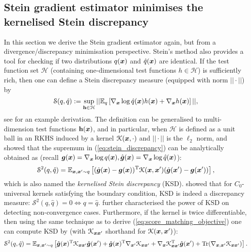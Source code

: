 \subsection{Stein gradient estimator minimises the kernelised Stein discrepancy}
In this section we derive the Stein gradient estimator again, but from a divergence/discrepancy minimisation perspective. 
%
Stein's method also provides a tool for checking if two distributions $q(\bm{x})$ and $\hat{q}(\bm{x})$ are identical. If the test function set $\mathcal{H}$ (containing one-dimensional test functions $h \in \mathcal{H}$) is sufficiently rich, then one can define a Stein discrepancy measure (equipped with norm $|| \cdot ||$) by
\begin{equation}
\mathcal{S}(q, \hat{q}) := \sup_{\mathbf{h} \in \mathcal{H}} || \mathbb{E}_{q} \left[ \nabla_{\bm{x}} \log \hat{q}(\bm{x}) h(\bm{x}) + \nabla_{\bm{x}} h(\bm{x}) \right] ||,
\label{eq:stein_discrepancy}
\end{equation}
see \cite{gorham:stein_method2015} for an example derivation. The definition can be generalised to multi-dimension test functions $\mathbf{h}(\bm{x})$, and in particular, when $\mathcal{H}$ is defined as a unit ball in an RKHS induced by a kernel $\mathcal{K}(\bm{x}, \cdot)$ and $|| \cdot ||$ is the $\ell_2$ norm, \cite{liu:ksd2016} and \cite{chwialkowski:ksd2016} showed that the supremum in (\ref{eq:stein_discrepancy}) can be analytically obtained as (recall $\bm{g}(\bm{x}) = \nabla_{\bm{x}} \log q(\bm{x}), \hat{\bm{g}}(\bm{x}) = \nabla_{\bm{x}} \log \hat{q}(\bm{x})$): 
\begin{equation}
\mathcal{S}^2(q, \hat{q}) = \mathbb{E}_{\bm{x}, \bm{x}' \sim q} \left[ (\hat{\bm{g}}(\bm{x}) - \bm{g}(\bm{x}) )^{\text{T}} \mathcal{K}(\bm{x}, \bm{x}') (\hat{\bm{g}}(\bm{x}') - \bm{g}(\bm{x}') ) \right],
\label{eq:ksd}
\end{equation}
which is also named the \emph{kernelised Stein discrepancy} (KSD). \cite{chwialkowski:ksd2016} showed that for $C_0$-universal kernels satisfying the boundary condition, KSD is indeed a discrepancy measure: $\mathcal{S}^2(q, \hat{q}) = 0 \Leftrightarrow q = \hat{q}$.  \cite{gorham:ksd2017} further characterised the power of KSD on detecting non-convergence cases. Furthermore, if the kernel is twice differentiable, then using the same technique as to derive (\ref{eq:score_matching_objective}) one can compute KSD by  (with $\mathcal{K}_{\bm{x} \bm{x}'}$ shorthand for $\mathcal{K}(\bm{x}, \bm{x}')$):
\begin{equation}
\mathcal{S}^2(q, \hat{q}) = \mathbb{E}_{\bm{x}, \bm{x}' \sim q} \left[ \hat{\bm{g}}(\bm{x})^{\text{T}} \mathcal{K}_{\bm{x} \bm{x}'} \hat{\bm{g}}(\bm{x}') + \hat{\bm{g}}(\bm{x})^{\text{T}} \nabla_{\bm{x}'} \mathcal{K}_{\bm{x} \bm{x}'} + \nabla_{\bm{x}} \mathcal{K}_{\bm{x} \bm{x}'}^{\text{T}} \hat{\bm{g}}(\bm{x}') + \text{Tr}(\nabla_{\bm{x}, \bm{x}'} \mathcal{K}_{\bm{x} \bm{x}'} )\right].
\label{eq:ksd_transformed}
\end{equation}
